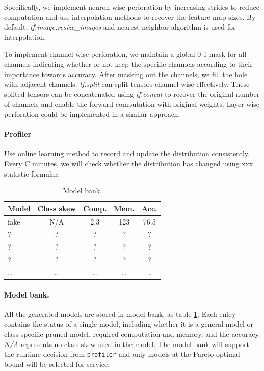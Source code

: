 \documentclass[pageno]{jpaper}
\begin{document}
Specifically, we implement neuron-wise perforation by increasing strides to reduce computation and use interpolation methods to recover the feature map sizes. By default, \textit{tf.image.resize\_images} and nearest neighbor algorithm is used for interpolation. 

To implement channel-wise perforation, we maintain a global 0-1 mask for all channels indicating whether or not keep the specific channels according to their importance towards accuracy. After masking out the channels, we fill the hole with adjacent channels. \textit{tf.split} can split tensors channel-wise effectively. These splited tensors can be concatenated using \textit{tf.concat} to recover the original number of channels and enable the forward computation with original weights. Layer-wise perforation could be implemented in a similar approach.


\paragraph{Profiler}
Use online learning method to record and update the distribution consistently. Every C minutes, we will check whether the distribution has changed using xxx statistic formular.


\begin{table}
    \centering
    \begin{tabular}{l|c|c|c|c}
        \hline
        Model & Class skew  & Comp. & Mem. & Acc. \\
        \hline
        fake & N/A & 2.3 & 123 & 76.5 \\
        ? & ? & ? & ? & ? \\
        ? & ? & ? & ? & ? \\
        ? & ? & ? & ? & ? \\
        \dots & \dots & \dots & \dots & \dots \\
        \hline
    \end{tabular}
    \vspace{1em}
    \caption{Model bank.}
    \label{tab:modelBank}
\end{table}

\paragraph{Model bank.}
All the generated models are stored in model bank, as table \ref{tab:modelBank}. Each entry contains the status of a single model, including whether it is a general model or class-specific pruned model, required computation and memory, and the accuracy. \textit{N/A} represents no class skew used in the model. The model bank will support the runtime decision from \texttt{profiler} and only models at the Pareto-optimal bound will be selected for service.
\end{document}
